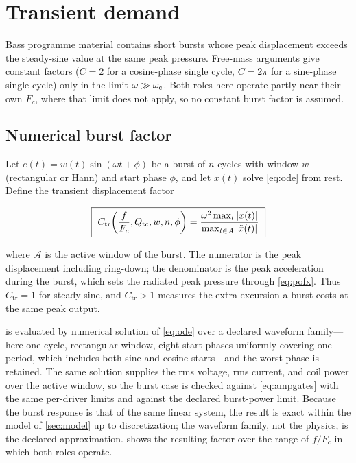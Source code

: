 \section{Transient demand}
\label{sec:time}

Bass programme material contains short bursts whose peak displacement
exceeds the steady-sine value at the same peak pressure. Free-mass
arguments give constant factors ($C=2$ for a cosine-phase single cycle,
$C=2\pi$ for a sine-phase single cycle) only in the limit
$\omega\gg\omega_{\mathrm{c}}$. Both roles here operate partly near their own $F_c$, where
that limit does not apply, so no constant burst factor is assumed.

\subsection{Numerical burst factor}
\label{sec:time-ctr}

Let $e(t)=w(t)\sin(\omega t+\phi)$ be a burst of $n$ cycles with window
$w$ (rectangular or Hann) and start phase $\phi$, and let $x(t)$ solve
\cref{eq:ode} from rest. Define the transient displacement factor

\begin{equation}
	\boxed{\ C_{\mathrm{tr}}\!\left(\frac{f}{F_c},\Qtc,w,n,\phi\right)
	= \frac{\omega^{2}\max_t|x(t)|}
	       {\max_{t\in\mathcal A}|\ddot x(t)|}\ }
	\label{eq:ctr}
\end{equation}

where $\mathcal A$ is the active window of the burst. The numerator is the
peak displacement including ring-down; the denominator is the peak
acceleration during the burst, which sets the radiated peak pressure
through \cref{eq:pofx}. Thus $C_{\mathrm{tr}}=1$ for steady sine, and
$C_{\mathrm{tr}}>1$ measures the extra excursion a burst costs at the same
peak output.

 is evaluated by numerical solution of \cref{eq:ode} over a
declared waveform family---here one cycle, rectangular window, eight start
phases uniformly covering one period, which includes both sine and cosine
starts---and the worst phase is retained. The same solution supplies the
rms voltage, rms current, and coil power over the active window, so the
burst case is checked against \cref{eq:ampgates} with the same
per-driver limits and against the declared burst-power limit. Because
the burst response is that of the same linear system, the result is exact
within the model of \cref{sec:model} up to discretization; the waveform
family, not the physics, is the declared approximation.
 shows the resulting factor over the range of $f/F_c$
in which both roles operate.

